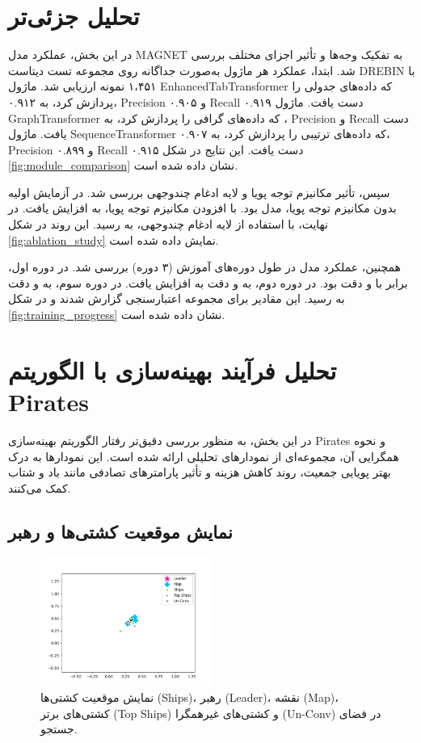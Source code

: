 \section{تحلیل جزئی‌تر}
در این بخش، عملکرد مدل MAGNET به تفکیک وجه‌ها و تأثیر اجزای مختلف بررسی شد. ابتدا، عملکرد هر ماژول به‌صورت جداگانه روی مجموعه تست دیتاست DREBIN \cite{Drebin} با ۱،۴۵۱ نمونه ارزیابی شد. ماژول EnhancedTabTransformer که داده‌های جدولی را پردازش کرد، به  ۰.۹۱۲، Precision ۰.۹۰۵ و Recall ۰.۹۱۹ دست یافت. ماژول GraphTransformer که داده‌های گرافی را پردازش کرد، به  ، Precision  و Recall  دست یافت. ماژول SequenceTransformer که داده‌های ترتیبی را پردازش کرد، به  ۰.۹۰۷، Precision ۰.۸۹۹ و Recall ۰.۹۱۵ دست یافت. این نتایج در شکل \ref{fig:module_comparison} نشان داده شده است.

سپس، تأثیر مکانیزم توجه پویا و لایه ادغام چندوجهی بررسی شد. در آزمایش اولیه بدون مکانیزم توجه پویا،  مدل  بود. با افزودن مکانیزم توجه پویا،  به  افزایش یافت. در نهایت، با استفاده از لایه ادغام چندوجهی،  به  رسید. این روند در شکل \ref{fig:ablation_study} نمایش داده شده است.

همچنین، عملکرد مدل در طول دوره‌های آموزش (۳ دوره) بررسی شد. در دوره اول،  برابر با  و دقت  بود. در دوره دوم،  به  و دقت به  افزایش یافت. در دوره سوم،  به  و دقت به  رسید. این مقادیر برای مجموعه اعتبارسنجی گزارش شدند و در شکل \ref{fig:training_progress} نشان داده شده است.

\section{تحلیل فرآیند بهینه‌سازی با الگوریتم Pirates}
در این بخش، به منظور بررسی دقیق‌تر رفتار الگوریتم بهینه‌سازی Pirates و نحوه همگرایی آن، مجموعه‌ای از نمودارهای تحلیلی ارائه شده است. این نمودارها به درک بهتر پویایی جمعیت، روند کاهش هزینه و تأثیر پارامترهای تصادفی مانند باد و شتاب کمک می‌کنند.

\subsection{نمایش موقعیت کشتی‌ها و رهبر}
\begin{figure}[h!]
    \centering
    \includegraphics[width=0.5\textwidth]{images/pirates_positions.png}
    \caption{نمایش موقعیت کشتی‌ها (Ships)، رهبر (Leader)، نقشه (Map)، کشتی‌های برتر (Top Ships) و کشتی‌های غیرهمگرا (Un-Conv) در فضای جستجو.}
    \label{fig:pirates_positions}
\end{figure}

